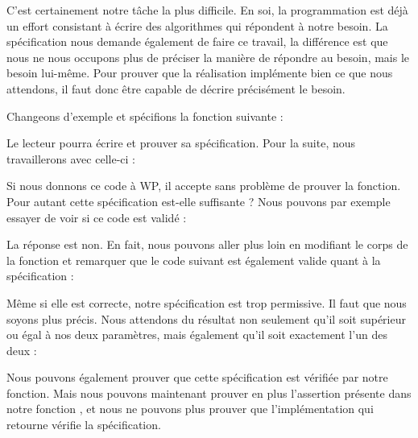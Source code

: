 

C'est certainement notre tâche la plus difficile. En soi, la programmation est
déjà un effort consistant à écrire des algorithmes qui répondent à notre
besoin. La spécification nous demande également de faire ce travail, la
différence est que nous ne nous occupons plus de préciser la manière de répondre
au besoin, mais le besoin lui-même. Pour prouver que la réalisation implémente
bien ce que nous attendons, il faut donc être capable de décrire précisément le
besoin.



Changeons d'exemple et spécifions la fonction suivante :






Le lecteur pourra écrire et prouver sa spécification. Pour la suite, nous
travaillerons avec celle-ci :






Si nous donnons ce code à WP, il accepte sans problème de prouver la fonction.
Pour autant cette spécification est-elle suffisante ? Nous pouvons par exemple
essayer de voir si ce code est validé :






La réponse est non. En fait, nous pouvons aller plus loin en modifiant le corps
de la fonction  et remarquer que le code suivant est également valide
quant à la spécification :







Même si elle est correcte, notre spécification est trop permissive. Il faut que nous
soyons plus précis.
Nous attendons du résultat non seulement qu'il soit supérieur ou égal à nos
deux paramètres, mais également qu'il soit exactement l'un des deux :





Nous pouvons également prouver que cette spécification est vérifiée par notre
fonction. Mais nous pouvons maintenant prouver en plus l'assertion présente dans
notre fonction , et nous ne pouvons plus prouver que
l'implémentation qui retourne  vérifie la spécification.


